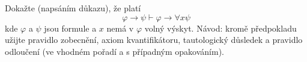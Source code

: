 Dokažte (napsáním důkazu), že platí 
$$\varphi \rightarrow \psi  \vdash \varphi\rightarrow \forall x\psi$$
kde $\varphi$ a $\psi$ jsou formule a $x$ nemá v $\varphi$ volný výskyt. Návod:
kromě předpokladu užijte pravidlo zobecnění, axiom kvantifikátoru, tautologický
důsledek a pravidlo odloučení (ve vhodném pořadí a s případným opakováním).
